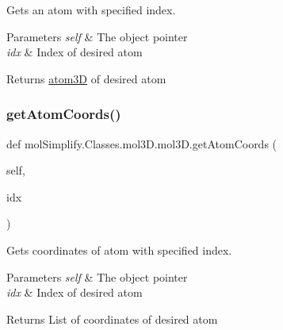 Gets an atom with specified index. 


\begin{DoxyParams}{Parameters}
{\em self} & The object pointer \\
\hline
{\em idx} & Index of desired atom \\
\hline
\end{DoxyParams}
\begin{DoxyReturn}{Returns}
\hyperlink{namespacemolSimplify_1_1Classes_1_1atom3D}{atom3D} of desired atom 
\end{DoxyReturn}
\mbox{\label{classmolSimplify_1_1Classes_1_1mol3D_1_1mol3D_a67307accd49f78a076a0139591fdefb7}} 
\subsubsection{\texorpdfstring{get\+Atom\+Coords()}{getAtomCoords()}}
{\footnotesize\ttfamily def mol\+Simplify.\+Classes.\+mol3\+D.\+mol3\+D.\+get\+Atom\+Coords (\begin{DoxyParamCaption}\item[{}]{self,  }\item[{}]{idx }\end{DoxyParamCaption})}



Gets coordinates of atom with specified index. 


\begin{DoxyParams}{Parameters}
{\em self} & The object pointer \\
\hline
{\em idx} & Index of desired atom \\
\hline
\end{DoxyParams}
\begin{DoxyReturn}{Returns}
List of coordinates of desired atom 
\end{DoxyReturn}
\mbox{\label{classmolSimplify_1_1Classes_1_1mol3D_1_1mol3D_a28a0a4e056758a2cc390899e9b34baaa}} 
